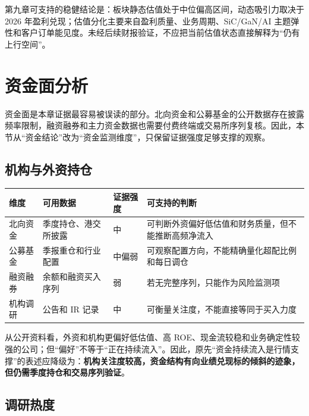 \begin{keyinsight}[估值小结]
第九章可支持的稳健结论是：板块静态估值处于中位偏高区间，动态吸引力取决于 2026 年盈利兑现；估值分化主要来自盈利质量、业务周期、SiC/GaN/AI 主题弹性和客户订单能见度。未经后续财报验证，不应把当前估值状态直接解释为“仍有上行空间”。
\end{keyinsight}

\section{资金面分析}

资金面是本章证据最容易被误读的部分。北向资金和公募基金的公开数据存在披露频率限制，融资融券和主力资金数据也需要付费终端或交易所序列复核。因此，本节从“资金结论”改为“资金监测维度”，只保留证据强度足够支撑的观察。

\subsection{机构与外资持仓}

\begin{exhibitbox}[表 9-6：资金面可用证据与证据强度]
\centering
\small
\begin{tabularx}{\exhibitboxwidth}{L{2.4cm} L{2.6cm} L{2.2cm} X}
\toprule
\textbf{维度} & \textbf{可用数据} & \textbf{证据强度} & \textbf{可支持的判断} \\
\midrule
北向资金 & 季度持仓、港交所披露 & 中 & 可判断外资偏好低估值和财务质量，但不能推断高频净流入 \\
公募基金 & 季报重仓和行业配置 & 中偏弱 & 可观察配置方向，不能精确量化超配比例和每日调仓 \\
融资融券 & 余额和融资买入序列 & 弱 & 若无完整序列，只能作为风险监测项 \\
机构调研 & 公告和 IR 记录 & 中 & 可衡量关注度，不能直接等同于买入力度 \\
\bottomrule
\end{tabularx}
\end{exhibitbox}

从公开资料看，外资和机构更偏好低估值、高 ROE、现金流较稳和业务确定性较强的公司；但“偏好”不等于“正在持续流入”。因此，原先“资金持续流入是行情支撑”的表述应降级为：\textbf{机构关注度较高，资金结构有向业绩兑现标的倾斜的迹象，但仍需季度持仓和交易序列验证}。

\subsection{调研热度}

